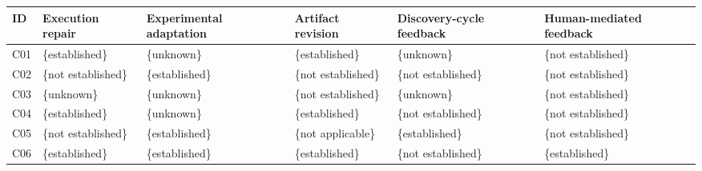 \begin{tabular}{lp{.16\linewidth}p{.16\linewidth}p{.16\linewidth}p{.16\linewidth}p{.16\linewidth}}
\toprule
ID & Execution repair & Experimental adaptation & Artifact revision & Discovery-cycle feedback & Human-mediated feedback \\
\midrule
C01 & \{established\} & \{unknown\} & \{established\} & \{unknown\} & \{not established\} \\
C02 & \{not established\} & \{established\} & \{not established\} & \{not established\} & \{not established\} \\
C03 & \{unknown\} & \{unknown\} & \{not established\} & \{unknown\} & \{not established\} \\
C04 & \{established\} & \{unknown\} & \{established\} & \{not established\} & \{not established\} \\
C05 & \{not established\} & \{established\} & \{not applicable\} & \{established\} & \{not established\} \\
C06 & \{established\} & \{established\} & \{established\} & \{not established\} & \{established\} \\
\bottomrule
\end{tabular}
